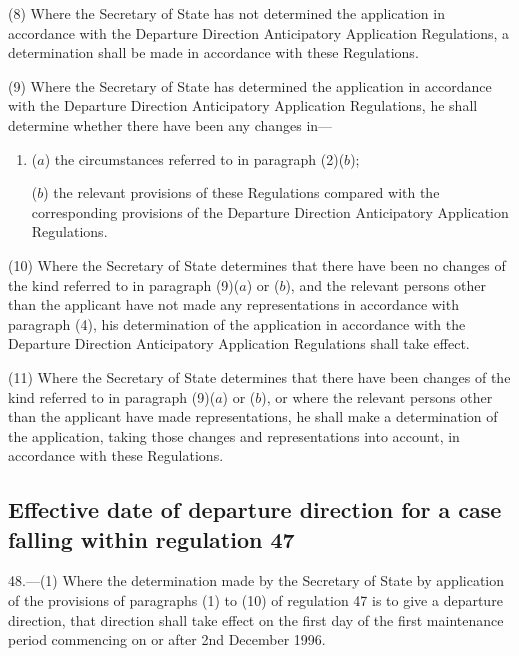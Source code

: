 \documentclass[12pt,a4paper]{article}
\begin{document}
(8) Where the Secretary of State has not determined the application in
accordance with the Departure Direction Anticipatory Application Regulations, a
determination shall be made in accordance with these Regulations.

(9) Where the Secretary of State has determined the application in accordance
with the Departure Direction Anticipatory Application Regulations, he shall
determine whether there have been any changes in—
\begin{enumerate}\item[]
($a$) the circumstances referred to in paragraph (2)($b$);

($b$) the relevant provisions of these Regulations compared with the corresponding
provisions of the Departure Direction Anticipatory Application Regulations.
\end{enumerate}

(10) Where the Secretary of State determines that there have been no changes of
the kind referred to in paragraph (9)($a$) or ($b$), and the relevant persons other
than the applicant have not made any representations in accordance with
paragraph (4), his determination of the application in accordance with the
Departure Direction Anticipatory Application Regulations shall take effect.

(11) Where the Secretary of State determines that there have been changes of the
kind referred to in paragraph (9)($a$) or ($b$), or where the relevant persons other
than the applicant have made representations, he shall make a determination of
the application, taking those changes and representations into account, in
accordance with these Regulations.


\subsection[48. Effective date of departure direction for a case falling within regulation
47]{\sloppy Effective date of departure direction for a case falling within regulation
47}

48.—(1) Where the determination made by the Secretary of State by application
of the provisions of paragraphs (1) to (10) of regulation 47 is to give a
departure direction, that direction shall take effect on the first day of the
first maintenance period commencing on or after 2nd December 1996.
\end{document}
